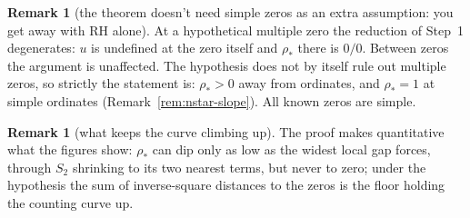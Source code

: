 \documentclass[11pt]{article}
\theoremstyle{definition}
\newtheorem{remark}[theorem]{Remark}
\begin{document}
\begin{remark}[the theorem doesn't need simple zeros as an extra
assumption: you get away with RH alone]\label{rem:simplicity}
At a hypothetical multiple zero the reduction of Step~1 degenerates: $u$ is
undefined at the zero itself and $\rho_{\ast}$ there is $0/0$. Between zeros the
argument is unaffected. The hypothesis does not by itself rule out multiple
zeros, so strictly the statement is: $\rho_{\ast}>0$ away from ordinates, and
$\rho_{\ast}=1$ at simple ordinates (Remark~\ref{rem:nstar-slope}). All known zeros
are simple.
\end{remark}

\begin{remark}[what keeps the curve climbing up]\label{rem:floor}
The proof makes quantitative what the figures show: $\rho_{\ast}$ can dip only as
low as the widest local gap forces, through $S_2$ shrinking to its two
nearest terms, but never to zero; under the hypothesis the sum of
inverse-square distances to the zeros is the floor holding the counting
curve up.
\end{remark}
\end{document}
